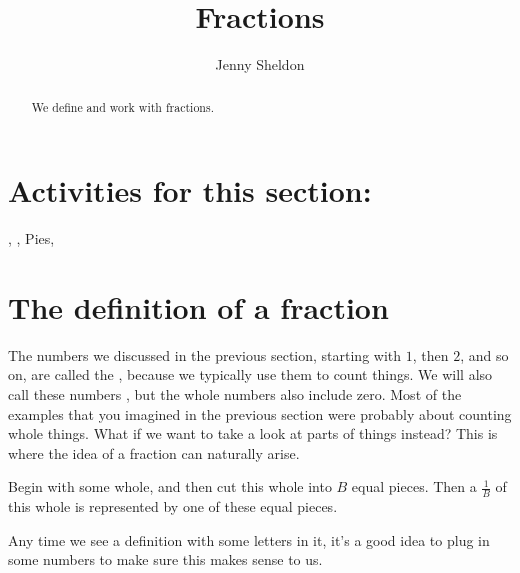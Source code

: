 \documentclass{ximera}
\title{Fractions}
\author{Jenny Sheldon}
\begin{document}
\begin{abstract}
We define and work with fractions.
\end{abstract}
\maketitle

\section{Activities for this section:} 
, 
, 
Pies, 

\section{The definition of a fraction}

The numbers we discussed in the previous section, starting with $1$, then $2$, and so on, are called the , because we typically use them to count things. We will also call these numbers , but the whole numbers also include zero. Most of the examples that you imagined in the previous section were probably about counting whole things. What if we want to take a look at parts of things instead? This is where the idea of a fraction can naturally arise. 

\begin{definition}
Begin with some whole, and then cut this whole into $B$ equal pieces. Then a  $\frac{1}{B}$ of this whole is represented by one of these equal pieces.
\end{definition}
Any time we see a definition with some letters in it, it's a good idea to plug in some numbers to make sure this makes sense to us.
\end{document}
